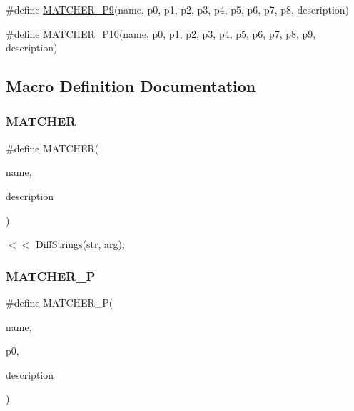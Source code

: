 \begin{DoxyCompactItemize}
\item 
\#define \mbox{\hyperlink{googletest-master_2googlemock_2include_2gmock_2gmock-generated-matchers_8h_a2dc1db146d4112c9fde1c2708807e43e}{M\+A\+T\+C\+H\+E\+R\+\_\+\+P9}}(name,  p0,  p1,  p2,  p3,  p4,  p5,  p6,  p7,  p8,  description)
\item 
\#define \mbox{\hyperlink{googletest-master_2googlemock_2include_2gmock_2gmock-generated-matchers_8h_aa6a3925eeb8bcb4b6b3465cc4ff26650}{M\+A\+T\+C\+H\+E\+R\+\_\+\+P10}}(name,  p0,  p1,  p2,  p3,  p4,  p5,  p6,  p7,  p8,  p9,  description)
\end{DoxyCompactItemize}


\subsection{Macro Definition Documentation}
\mbox{\label{googletest-master_2googlemock_2include_2gmock_2gmock-generated-matchers_8h_af4fe73ff8e2b0494f4970b575b65ddff}} 
\subsubsection{\texorpdfstring{MATCHER}{MATCHER}}
{\footnotesize\ttfamily \#define M\+A\+T\+C\+H\+ER(\begin{DoxyParamCaption}\item[{}]{name,  }\item[{}]{description }\end{DoxyParamCaption})}



$<$$<$ Diff\+Strings(str, arg); 

\mbox{\label{googletest-master_2googlemock_2include_2gmock_2gmock-generated-matchers_8h_acb7ae915efa2fd8d3f6ea7313198afb6}} 
\subsubsection{\texorpdfstring{MATCHER\_P}{MATCHER\_P}}
{\footnotesize\ttfamily \#define M\+A\+T\+C\+H\+E\+R\+\_\+P(\begin{DoxyParamCaption}\item[{}]{name,  }\item[{}]{p0,  }\item[{}]{description }\end{DoxyParamCaption})}

